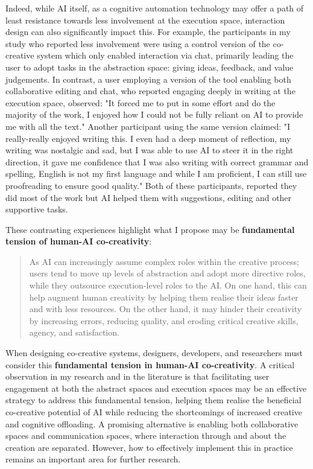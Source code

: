 Indeed, while AI itself, as a cognitive automation technology may offer a path of least resistance towards less involvement at the execution space, interaction design can also significantly impact this. For example, the participants in my study who reported less involvement were using a control version of the co-creative system which only enabled interaction via chat, primarily leading the user to adopt tasks in the abstraction space: giving ideas, feedback, and value judgements. In contrast, a user employing a version of the tool enabling both collaborative editing and chat, who reported engaging deeply in writing at the execution space, observed: "It forced me to put in some effort and do the majority of the work, I enjoyed how I could not be fully reliant on AI to provide me with all the text." Another participant using the same version claimed: "I really-really enjoyed writing this. I even had a deep moment of reflection, my writing was nostalgic and sad, but I was able to use AI to steer it in the right direction, it gave me confidence that I was also writing with correct grammar and spelling, English is not my first language and while I am proficient, I can still use proofreading to ensure good quality." Both of these participants, reported they did most of the work but AI helped them with suggestions, editing and other supportive tasks. 

These contrasting experiences highlight what I propose may be \textbf{fundamental tension of human-AI co-creativity}:

\begin{quote}
    As AI can increasingly assume complex roles within the creative process; users tend to move up levels of abstraction and adopt more directive roles, while they outsource execution-level roles to the AI. On one hand, this can help augment human creativity by helping them realise their ideas faster and with less resources. On the other hand, it may hinder their creativity by increasing errors, reducing quality, and eroding critical creative skills, agency, and satisfaction.
\end{quote}

When designing co-creative systems, designers, developers, and researchers must consider this \textbf{fundamental tension in human-AI co-creativity}. A critical observation in my research and in the literature is that facilitating user engagement at both the abstract spaces and execution spaces may be an effective strategy to address this fundamental tension, helping them realise the beneficial co-creative potential of AI while reducing the shortcomings of increased creative and cognitive offloading. A promising alternative is enabling both collaborative spaces and communication spaces, where interaction through and about the creation are separated. However, how to effectively implement this in practice remains an important area for further research. 

